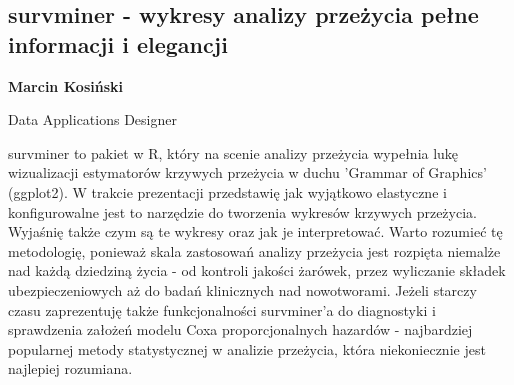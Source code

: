 \documentclass[\main/boa.tex]{subfiles}
\begin{document}
\subsection{survminer - wykresy analizy przeżycia pełne informacji i elegancji}

\begin{minipage}{0.915\textwidth}
	\centering
  {\bf {} Marcin Kosiński}
\end{minipage}


\begin{affiliations}
\begin{minipage}{0.915\textwidth}
\centering
Data Applications Designer \\[-2pt]
\end{minipage}
\end{affiliations}

\vskip 0.3cm

survminer to pakiet w R, który na scenie analizy przeżycia wypełnia lukę wizualizacji estymatorów krzywych przeżycia w duchu 'Grammar of Graphics' (ggplot2). W trakcie prezentacji przedstawię jak wyjątkowo elastyczne i konfigurowalne jest to narzędzie do tworzenia wykresów krzywych przeżycia. Wyjaśnię także czym są te wykresy oraz jak je interpretować. Warto rozumieć tę metodologię, ponieważ skala zastosowań analizy przeżycia jest rozpięta niemalże nad każdą dziedziną życia - od kontroli jakości żarówek, przez wyliczanie składek ubezpieczeniowych aż do badań klinicznych nad nowotworami. Jeżeli starczy czasu zaprezentuję także funkcjonalności survminer'a do diagnostyki i sprawdzenia założeń modelu Coxa proporcjonalnych hazardów - najbardziej popularnej metody statystycznej w analizie przeżycia, która niekoniecznie jest najlepiej rozumiana. 
\end{document}
